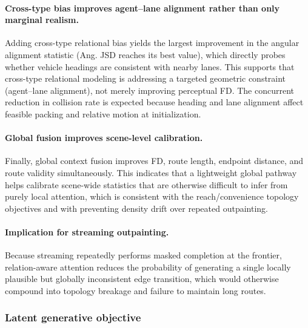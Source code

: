 \documentclass{article}
\theoremstyle{plain}
\theoremstyle{definition}
\theoremstyle{remark}
\begin{document}
\paragraph{Cross-type bias improves agent--lane alignment rather than only marginal realism.}
Adding cross-type relational bias yields the largest improvement in the angular alignment statistic (Ang. JSD reaches its best value),
which directly probes whether vehicle headings are consistent with nearby lanes.
This supports that cross-type relational modeling is addressing a targeted geometric constraint (agent--lane alignment), not merely improving perceptual FD.
The concurrent reduction in collision rate is expected because heading and lane alignment affect feasible packing and relative motion at initialization.

\paragraph{Global fusion improves scene-level calibration.}
Finally, global context fusion improves FD, route length, endpoint distance, and route validity simultaneously.
This indicates that a lightweight global pathway helps calibrate scene-wide statistics that are otherwise difficult to infer from purely local attention,
which is consistent with the reach/convenience topology objectives and with preventing density drift over repeated outpainting.

\paragraph{Implication for streaming outpainting.}
Because streaming repeatedly performs masked completion at the frontier, relation-aware attention reduces the probability of generating a single locally plausible but globally inconsistent edge transition, which would otherwise compound into topology breakage and failure to maintain long routes.

\subsubsection{Latent generative objective}
\label{app:extraexp:meanflow}
\end{document}
